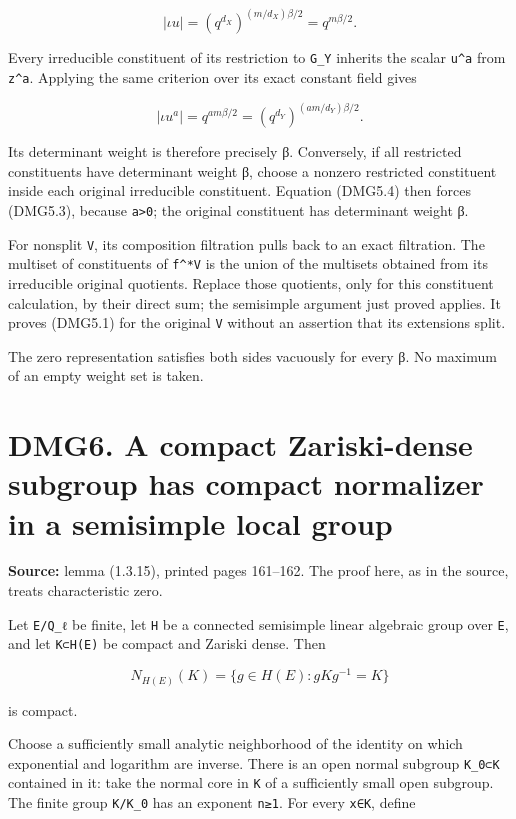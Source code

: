 \documentclass[
]{report}
\begin{document}
\[
|\iota u|=(q^{d_X})^{(m/d_X)\beta/2}=q^{m\beta/2}.
\tag{DMG5.3}
\]

Every irreducible constituent of its restriction to \texttt{G\_Y}
inherits the scalar \texttt{u\^{}a} from \texttt{z\^{}a}. Applying the
same criterion over its exact constant field gives

\[
|\iota u^a|=q^{am\beta/2}
=(q^{d_Y})^{(am/d_Y)\beta/2}.
\tag{DMG5.4}
\]

Its determinant weight is therefore precisely β. Conversely, if all
restricted constituents have determinant weight β, choose a nonzero
restricted constituent inside each original irreducible constituent.
Equation (DMG5.4) then forces (DMG5.3), because
\texttt{a\textgreater{}0}; the original constituent has determinant
weight β.

For nonsplit \texttt{V}, its composition filtration pulls back to an
exact filtration. The multiset of constituents of \texttt{f\^{}*V} is
the union of the multisets obtained from its irreducible original
quotients. Replace those quotients, only for this constituent
calculation, by their direct sum; the semisimple argument just proved
applies. It proves (DMG5.1) for the original \texttt{V} without an
assertion that its extensions split.

The zero representation satisfies both sides vacuously for every β. No
maximum of an empty weight set is taken.

\section{DMG6. A compact Zariski-dense subgroup has compact normalizer
in a semisimple local
group}\label{dmg6.-a-compact-zariski-dense-subgroup-has-compact-normalizer-in-a-semisimple-local-group}

\textbf{Source:} lemma (1.3.15), printed pages 161--162. The proof here,
as in the source, treats characteristic zero.

Let \texttt{E/Q\_ℓ} be finite, let \texttt{H} be a connected semisimple
linear algebraic group over \texttt{E}, and let \texttt{K⊂H(E)} be
compact and Zariski dense. Then

\[
N_{H(E)}(K)=\{g\in H(E):gKg^{-1}=K\}
\]

is compact.

Choose a sufficiently small analytic neighborhood of the identity on
which exponential and logarithm are inverse. There is an open normal
subgroup \texttt{K\_0⊂K} contained in it: take the normal core in
\texttt{K} of a sufficiently small open subgroup. The finite group
\texttt{K/K\_0} has an exponent \texttt{n≥1}. For every \texttt{x∈K},
define
\end{document}
